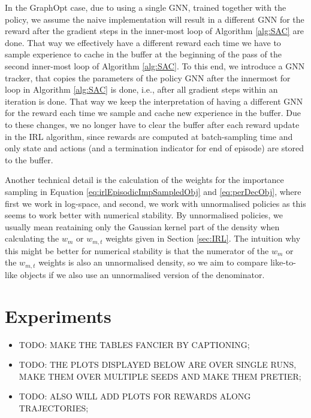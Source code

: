 \documentclass{report}
\numberwithin{equation}{section}
\numberwithin{figure}{section}
\numberwithin{table}{section}
\numberwithin{algorithm}{section}
\begin{document}
In the GraphOpt case, due to using a single GNN, 
trained together with the policy, we assume the naive implementation 
will result in a different GNN for the reward 
after the gradient steps in the inner-most loop of Algorithm 
\ref{alg:SAC} are done. That way we effectively have a different 
reward each time we have to sample experience to cache in the 
buffer at the beginning of the pass of the second inner-most 
loop of Algorithm \ref{alg:SAC}. To this end,
we introduce a GNN tracker, 
that copies the parameters of the policy GNN after the innermost 
for loop in Algorithm \ref{alg:SAC} is done, i.e., after all 
gradient steps within an iteration is done. That way we keep the 
interpretation of having a different GNN for the reward each 
time we sample and cache new experience in the buffer. Due to 
these changes, we no longer have to clear the buffer after each 
reward update in the IRL algorithm, since rewards are computed 
at batch-sampling time and only state and actions (and a termination 
indicator for end of episode) are stored 
to the buffer.

Another technical detail is the calculation of the weights 
for the importance sampling in Equation \ref{eq:irlEpisodicImpSampledObj} 
and \ref{eq:perDecObj}, where first we work in log-space, and 
second, we work with unnormalised policies as this seems to work 
better with numerical stability. By unnormalised policies, we 
usually mean reataining only the Gaussian kernel part of the 
density when calculating the $w_m$ or $w_{m,t}$ weights given 
in Section \ref{sec:IRL}. The intuition why this might be better 
for numerical stability is that the numerator of the $w_m$ 
or the $w_{m,t}$ weights is also an unnormalised density, so 
we aim to compare like-to-like objects if we also use an 
unnormalised version of the denominator.

\chapter{Experiments}\label{chap:experiments}

\begin{itemize}
  \item TODO: MAKE THE TABLES FANCIER BY CAPTIONING;
  \item TODO: THE PLOTS DISPLAYED BELOW ARE OVER SINGLE RUNS, 
  MAKE THEM OVER MULTIPLE SEEDS AND MAKE THEM PRETIER;
  \item TODO: ALSO WILL ADD PLOTS FOR REWARDS ALONG TRAJECTORIES;
\end{itemize}
\end{document}

